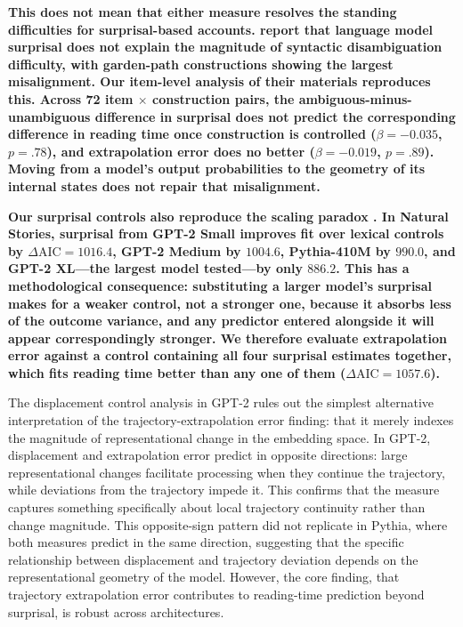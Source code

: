 \documentclass[12pt]{article}
\newcommand{\new}[1]{{\bfseries #1}}
\begin{document}
\new{This does not mean that either measure resolves the standing difficulties for surprisal-based accounts. \citet{huang2024} report that language model surprisal does not explain the magnitude of syntactic disambiguation difficulty, with garden-path constructions showing the largest misalignment. Our item-level analysis of their materials reproduces this. Across 72 item $\times$ construction pairs, the ambiguous-minus-unambiguous difference in surprisal does not predict the corresponding difference in reading time once construction is controlled ($\beta = -0.035$, $p = .78$), and extrapolation error does no better ($\beta = -0.019$, $p = .89$). Moving from a model's output probabilities to the geometry of its internal states does not repair that misalignment.}

\new{Our surprisal controls also reproduce the scaling paradox \citep{oh2023b}. In Natural Stories, surprisal from GPT-2 Small improves fit over lexical controls by $\Delta\text{AIC} = 1016.4$, GPT-2 Medium by $1004.6$, Pythia-410M by $990.0$, and GPT-2 XL---the largest model tested---by only $886.2$. This has a methodological consequence: substituting a larger model's surprisal makes for a weaker control, not a stronger one, because it absorbs less of the outcome variance, and any predictor entered alongside it will appear correspondingly stronger. We therefore evaluate extrapolation error against a control containing all four surprisal estimates together, which fits reading time better than any one of them ($\Delta\text{AIC} = 1057.6$).}

The displacement control analysis in GPT-2 rules out the simplest alternative interpretation of the trajectory-extrapolation error finding: that it merely indexes the magnitude of representational change in the embedding space. In GPT-2, displacement and extrapolation error predict in opposite directions: large representational changes facilitate processing when they continue the trajectory, while deviations from the trajectory impede it. This confirms that the measure captures something specifically about local trajectory continuity rather than change magnitude. This opposite-sign pattern did not replicate in Pythia, where both measures predict in the same direction, suggesting that the specific relationship between displacement and trajectory deviation depends on the representational geometry of the model. However, the core finding, that trajectory extrapolation error contributes to reading-time prediction beyond surprisal, is robust across architectures.
\end{document}
